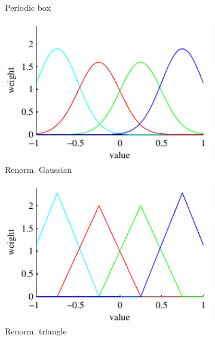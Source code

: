 \documentclass[thesis.tex]{subfiles}
\begin{document}
\begin{figure}
\begin{subfigure}[t]{0.32\textwidth}
		\caption{Periodic box}
		\label{fig:1dFilterBoxPeriodic}
	\end{subfigure}
	\begin{subfigure}[t]{0.32\textwidth}
		\includegraphics[width=\textwidth]{img/binFilterGaussianRenorm.pdf}
		\caption{Renorm. Gaussian}
		\label{fig:1dFilterGaussianRenorm}
	\end{subfigure}
	\begin{subfigure}[t]{0.32\textwidth}
		\includegraphics[width=\textwidth]{img/binFilterTriangleRenorm.pdf}
		\caption{Renorm. triangle}
		\label{fig:1dFilterTriangleRenorm}
	\end{subfigure}
	\begin{subfigure}[t]{0.32\textwidth}

\end{subfigure}
\end{figure}
\end{document}

